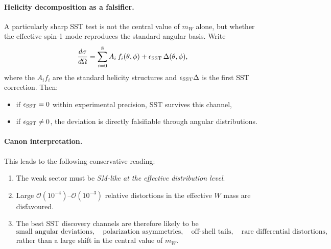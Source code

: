 \documentclass[11pt]{article}
\theoremstyle{definition}
\theoremstyle{plain}
\theoremstyle{remark}
\begin{document}
        \paragraph{Helicity decomposition as a falsifier.}
            A particularly sharp SST test is not the central value of $m_W$ alone, but whether the effective spin-1 mode reproduces the standard angular basis. Write
            \begin{equation}
                \frac{d\sigma}{d\Omega}
                =
                \sum_{i=0}^{8} A_i\, f_i(\theta,\phi)
                +
                \epsilon_{\rm SST}\,\Delta(\theta,\phi),
                \label{eq:helicity-decomp-sst}
            \end{equation}
            where the $A_i f_i$ are the standard helicity structures and $\epsilon_{\rm SST}\Delta$ is the first SST correction. Then:
            \begin{itemize}
                \item if $\epsilon_{\rm SST}=0$ within experimental precision, SST survives this channel,
                \item if $\epsilon_{\rm SST}\neq 0$, the deviation is directly falsifiable through angular distributions.
            \end{itemize}
    
        \paragraph{Canon interpretation.}
            This leads to the following conservative reading:
            \begin{enumerate}
                \item The weak sector must be \emph{SM-like at the effective distribution level}.
                \item Large $\mathcal{O}(10^{-4})$--$\mathcal{O}(10^{-3})$ relative distortions in the effective $W$ mass are disfavoured.
                \item The best SST discovery channels are therefore likely to be
                \begin{equation}
                    \text{small angular deviations},\quad
                    \text{polarization asymmetries},\quad
                    \text{off-shell tails},\quad
                    \text{rare differential distortions},
                \end{equation}
                rather than a large shift in the central value of $m_W$.
            \end{enumerate}
    
\end{document}
